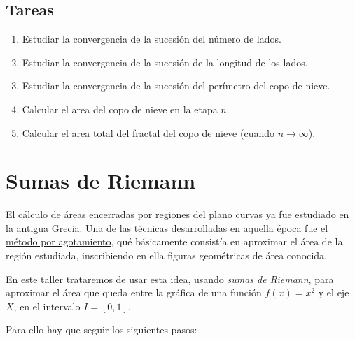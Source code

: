 \documentclass[
  a4paper,
]{scrreport}
\begin{document}
\section{Tareas}\label{tareas-1}

\begin{enumerate}
\def\labelenumi{\arabic{enumi}.}
\item
  Estudiar la convergencia de la sucesión del número de lados.
\item
  Estudiar la convergencia de la sucesión de la longitud de los lados.
\item
  Estudiar la convergencia de la sucesión del perímetro del copo de
  nieve.
\item
  Calcular el area del copo de nieve en la etapa \(n\).
\item
  Calcular el area total del fractal del copo de nieve (cuando
  \(n\to \infty\)).
\end{enumerate}


\chapter{Sumas de Riemann}\label{sumas-de-riemann}

El cálculo de áreas encerradas por regiones del plano curvas ya fue
estudiado en la antigua Grecia. Una de las técnicas desarrolladas en
aquella época fue el
\href{https://es.wikipedia.org/wiki/M\%C3\%A9todo_por_agotamiento}{método
por agotamiento}, qué básicamente consistía en aproximar el área de la
región estudiada, inscribiendo en ella figuras geométricas de área
conocida.

En este taller trataremos de usar esta idea, usando \emph{sumas de
Riemann}, para aproximar el área que queda entre la gráfica de una
función \(f(x)=x^2\) y el eje \(X\), en el intervalo \(I=[0,1]\).

Para ello hay que seguir los siguientes pasos:
\end{document}
